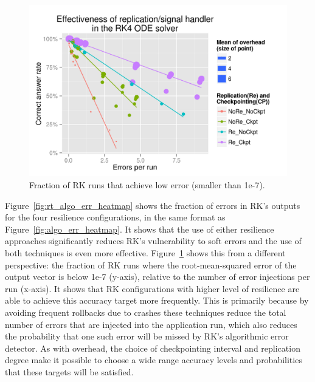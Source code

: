 \documentclass{sig-alternate}
\begin{document}
\begin{figure}[ht!]
\centering
\includegraphics[width=1.00\columnwidth]{figs/4_1_2_Exp2_Effectiveness.png}
\caption{Fraction of RK runs that achieve low error (smaller than 1e-7).}
\label{fig:rk_effectiveness}
\end{figure}

Figure~\ref{fig:rt_algo_err_heatmap} shows the fraction of errors in RK's outputs for the four resilience configurations, in the same format as Figure~\ref{fig:algo_err_heatmap}.
It shows that the use of either resilience approaches significantly reduces RK's vulnerability to soft errors and the use of both techniques is even more effective.
Figure~\ref{fig:rk_effectiveness} shows this from a different perspective: the fraction of RK runs where the root-mean-squared error of the output vector is below 1e-7 (y-axis), relative to the number of error injections per run (x-axis).
It shows that RK configurations with higher level of resilience are able to achieve this accuracy target more frequently.
This is primarily because by avoiding frequent rollbacks due to crashes these techniques reduce the total number of errors that are injected into the application run, which also reduces the probability that one such error will be missed by RK's algorithmic error detector.
As with overhead, the choice of checkpointing interval and replication degree make it possible to choose a wide range accuracy levels and probabilities that these targets will be satisfied.
\end{document}
